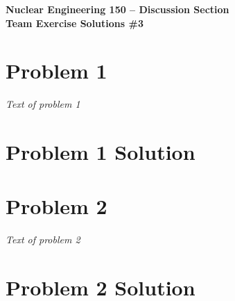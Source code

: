\documentclass{report}
\begin{document}
\begin{center}
\textbf{\large Nuclear Engineering 150 -- Discussion Section}\\ 
\textbf{Team Exercise Solutions \#3}
\end{center}

\section*{Problem 1}

\textit{Text of problem 1}



\section*{Problem 1 Solution}



\newpage
\section*{Problem 2}

\textit{Text of problem 2}



\section*{Problem 2 Solution}
\end{document}
